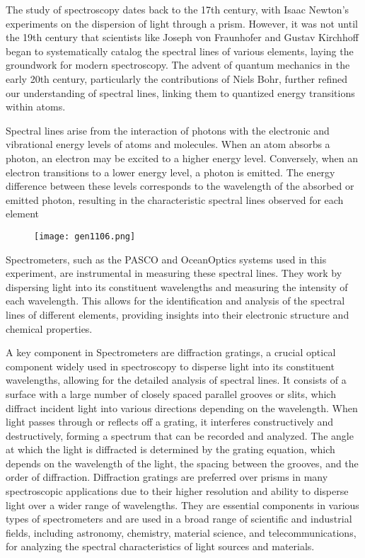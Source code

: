 \documentclass[12pt]{article}
\begin{document}
	The study of spectroscopy dates back to the 17th century, with Isaac Newton's experiments on the dispersion of light through a prism. However, it was not until the 19th century that scientists like Joseph von Fraunhofer and Gustav Kirchhoff began to systematically catalog the spectral lines of various elements, laying the groundwork for modern spectroscopy. The advent of quantum mechanics in the early 20th century, particularly the contributions of Niels Bohr, further refined our understanding of spectral lines, linking them to quantized energy transitions within atoms.
	
	Spectral lines arise from the interaction of photons with the electronic and vibrational energy levels of atoms and molecules. When an atom absorbs a photon, an electron may be excited to a higher energy level. Conversely, when an electron transitions to a lower energy level, a photon is emitted. The energy difference between these levels corresponds to the wavelength of the absorbed or emitted photon, resulting in the characteristic spectral lines observed for each element
	
	\begin{figure}[!h]
		\centering
		\label{SpectralLines}
		\texttt{[image: gen1106.png]}
	\end{figure}
	
	Spectrometers, such as the PASCO and OceanOptics systems used in this experiment, are instrumental in measuring these spectral lines. They work by dispersing light into its constituent wavelengths and measuring the intensity of each wavelength. This allows for the identification and analysis of the spectral lines of different elements, providing insights into their electronic structure and chemical properties.
	
	A key component in Spectrometers are diffraction gratings, a crucial optical component widely used in spectroscopy to disperse light into its constituent wavelengths, allowing for the detailed analysis of spectral lines. It consists of a surface with a large number of closely spaced parallel grooves or slits, which diffract incident light into various directions depending on the wavelength. When light passes through or reflects off a grating, it interferes constructively and destructively, forming a spectrum that can be recorded and analyzed. The angle at which the light is diffracted is determined by the grating equation, which depends on the wavelength of the light, the spacing between the grooves, and the order of diffraction. Diffraction gratings are preferred over prisms in many spectroscopic applications due to their higher resolution and ability to disperse light over a wider range of wavelengths. They are essential components in various types of spectrometers and are used in a broad range of scientific and industrial fields, including astronomy, chemistry, material science, and telecommunications, for analyzing the spectral characteristics of light sources and materials.
	
\end{document}
